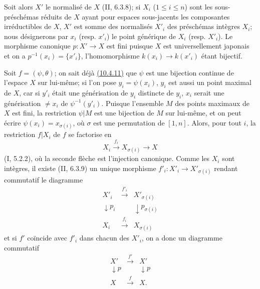 Soit alors $X'$ le normalisé de $X$ (II, 6.3.8); si $X_i$
($1\leq i\leq n$) sont les sous-préschémas réduits de $X$ ayant pour
espaces sous-jacents les composantes irréductibles de $X$, $X'$ est
somme des normalisés $X'_i$ des préschémas intègres $X_i$; nous
désignerons par $x_i$ (resp. $x'_i$) le point générique de $X_i$
(resp. $X'_i$). Le morphisme canonique $p:X'\to X$ est fini puisque
$X$ est universellement japonais et on a
$p^{-1}(x_i)=\{x'_i\}$, l'homomorphisme $k(x_i)\to k(x'_i)$ étant
bijectif.

Soit $f=(\psi,\theta)$; on sait déjà
{\hyperref[canon-index.ega4.c04.statement.10-4-11]{(10.4.11)}} que $\psi$ est une
bijection continue de l'espace $X$ sur lui-même; si l'on pose
$y_i=\psi(x_i)$, $y_i$ est aussi un point maximal de $X$, car si $y'_i$
était une générisation de $y_i$ distincte de $y_i$, $x_i$ serait une
générisation $\neq x_i$ de $\psi^{-1}(y'_i)$. Puisque l'ensemble $M$
des points maximaux de $X$ est fini, la restriction $\psi|M$ est une
bijection de $M$ sur lui-même, et on peut écrire
$\psi(x_i)=x_{\sigma(i)}$, où $\sigma$ est une permutation de
$[1,n]$. Alors, pour tout $i$, la restriction $f|X_i$ de $f$ se
factorise en
\[
 X_i\xrightarrow{f_i}X_{\sigma(i)}\longrightarrow X
\]
(I, 5.2.2), où la seconde flèche est l'injection canonique. Comme les
$X_i$ sont intègres, il existe (II, 6.3.9) un unique morphisme
$f'_i:X'_i\to X'_{\sigma(i)}$ rendant commutatif le diagramme
\[
\begin{array}{ccc}
X'_i&\xrightarrow{f'_i}&X'_{\sigma(i)}\\
\downarrow p_i&&\downarrow p_{\sigma(i)}\\
X_i&\xrightarrow{f_i}&X_{\sigma(i)}
\end{array}
\]
et si $f'$ coïncide avec $f'_i$ dans chacun des $X'_i$, on a donc un
diagramme commutatif
\begin{equation}
\label{IV.10.4.12.1.errata}
\begin{array}{ccc}
X'&\xrightarrow{f'}&X'\\
\downarrow p&&\downarrow p\\
X&\xrightarrow{f}&X.
\end{array}
\tag{10.4.12.1}
\end{equation}


